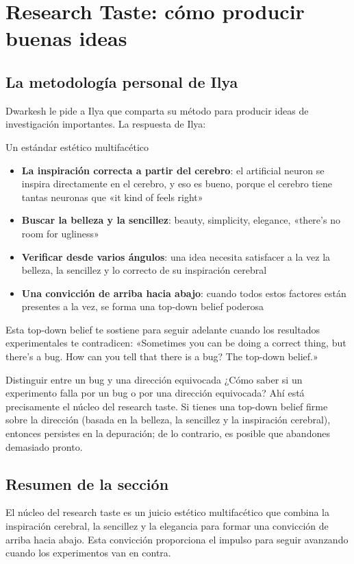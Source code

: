\section{Research Taste: cómo producir buenas ideas}

\subsection{La metodología personal de Ilya}

Dwarkesh le pide a Ilya que comparta su método para producir ideas de investigación importantes. La respuesta de Ilya:

\begin{importantbox}{Un estándar estético multifacético}
\begin{itemize}
    \item \textbf{La inspiración correcta a partir del cerebro}: el artificial neuron se inspira directamente en el cerebro, y eso es bueno, porque el cerebro tiene tantas neuronas que «it kind of feels right»
    \item \textbf{Buscar la belleza y la sencillez}: beauty, simplicity, elegance, «there's no room for ugliness»
    \item \textbf{Verificar desde varios ángulos}: una idea necesita satisfacer a la vez la belleza, la sencillez y lo correcto de su inspiración cerebral
    \item \textbf{Una convicción de arriba hacia abajo}: cuando todos estos factores están presentes a la vez, se forma una top-down belief poderosa
\end{itemize}
Esta top-down belief te sostiene para seguir adelante cuando los resultados experimentales te contradicen: «Sometimes you can be doing a correct thing, but there's a bug. How can you tell that there is a bug? The top-down belief.»
\end{importantbox}

\begin{knowledgebox}{Distinguir entre un bug y una dirección equivocada}
¿Cómo saber si un experimento falla por un bug o por una dirección equivocada? Ahí está precisamente el núcleo del research taste. Si tienes una top-down belief firme sobre la dirección (basada en la belleza, la sencillez y la inspiración cerebral), entonces persistes en la depuración; de lo contrario, es posible que abandones demasiado pronto.
\end{knowledgebox}

\subsection{Resumen de la sección}

El núcleo del research taste es un juicio estético multifacético que combina la inspiración cerebral, la sencillez y la elegancia para formar una convicción de arriba hacia abajo. Esta convicción proporciona el impulso para seguir avanzando cuando los experimentos van en contra.

